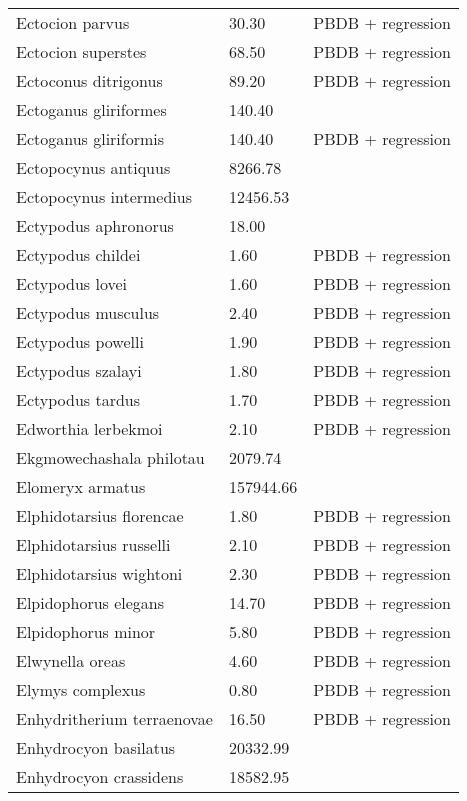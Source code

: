\documentclass{article}
\begin{document}
\begin{center}
\begin{longtable}{p{} p{} p{}}
    Ectocion parvus & 30.30 & PBDB + regression \\ 
    Ectocion superstes & 68.50 & PBDB + regression \\ 
    Ectoconus ditrigonus & 89.20 & PBDB + regression \\ 
    Ectoganus gliriformes & 140.40 & \cite{Novacek1977} \\ 
    Ectoganus gliriformis & 140.40 & PBDB + regression \\ 
    Ectopocynus antiquus & 8266.78 & \cite{Tomiya2013} \\ 
    Ectopocynus intermedius & 12456.53 & \cite{Tomiya2013} \\ 
    Ectypodus aphronorus & 18.00 & \cite{Wilson2012} \\ 
    Ectypodus childei & 1.60 & PBDB + regression \\ 
    Ectypodus lovei & 1.60 & PBDB + regression \\ 
    Ectypodus musculus & 2.40 & PBDB + regression \\ 
    Ectypodus powelli & 1.90 & PBDB + regression \\ 
    Ectypodus szalayi & 1.80 & PBDB + regression \\ 
    Ectypodus tardus & 1.70 & PBDB + regression \\ 
    Edworthia lerbekmoi & 2.10 & PBDB + regression \\ 
    Ekgmowechashala philotau & 2079.74 & \cite{Tomiya2013} \\ 
    Elomeryx armatus & 157944.66 & \cite{Tomiya2013} \\ 
    Elphidotarsius florencae & 1.80 & PBDB + regression \\ 
    Elphidotarsius russelli & 2.10 & PBDB + regression \\ 
    Elphidotarsius wightoni & 2.30 & PBDB + regression \\ 
    Elpidophorus elegans & 14.70 & PBDB + regression \\ 
    Elpidophorus minor & 5.80 & PBDB + regression \\ 
    Elwynella oreas & 4.60 & PBDB + regression \\ 
    Elymys complexus & 0.80 & PBDB + regression \\ 
    Enhydritherium terraenovae & 16.50 & PBDB + regression \\ 
    Enhydrocyon basilatus & 20332.99 & \cite{Tomiya2013} \\ 
    Enhydrocyon crassidens & 18582.95 & \cite{Tomiya2013} \\ 

\end{longtable}
\end{center}
\end{document}

